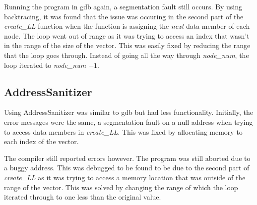 \documentclass[12pt]{article}
\begin{document}
Running the program in gdb again, a segmentation fault still occurs. By using backtracing, it was found that the issue was occuring in the second part of the \emph{create\_LL} function when the function is assigning the \emph{next} data member of each node. The loop went out of range as it was trying to access an index that wasn't in the range of the size of the vector. This was easily fixed by reducing the range that the loop goes through. Instead of going all the way through \emph{node\_num}, the loop iterated to \emph{node\_num $- 1$}. 

\subsection{AddressSanitizer}
Using AddressSanitizer was similar to gdb but had less functionality. Initially, the error messages were the same, a segmentation fault on a null address when trying to access data members in \emph{create\_LL}. This was fixed by allocating memory to each index of  the vector. 

The compiler still reported errors however. The program was still aborted due to a buggy address. This was debugged to be found to be due to the second part of \emph{create\_LL} as it was trying to access a memory location that was outside of the range of the vector. This was solved by changing the range of which the loop iterated through to one less than the original value. 
\end{document}
